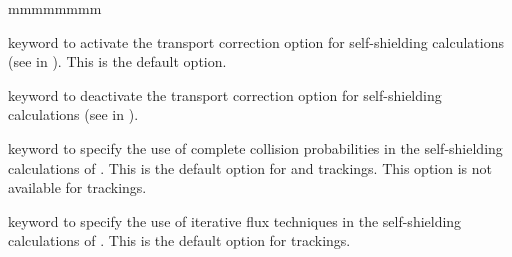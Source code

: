 \begin{ListeDeDescription}{mmmmmmmm}
\item[\moc{TRAN}] keyword to activate the transport correction option for
self-shielding calculations (see  in ). This is the default option.

\item[\moc{NOTR}] keyword to deactivate the transport correction option for
self-shielding calculations (see  in ).

\item[\moc{PIJ}] keyword to specify the use of complete collision
probabilities in the self-shielding calculations of .
This is the default option for  and  trackings.
This option is not available for  trackings.

\item[\moc{ARM}] keyword to specify the use of iterative flux techniques
in the self-shielding calculations of .
This is the default option for  trackings.

\end{ListeDeDescription}
\eject
